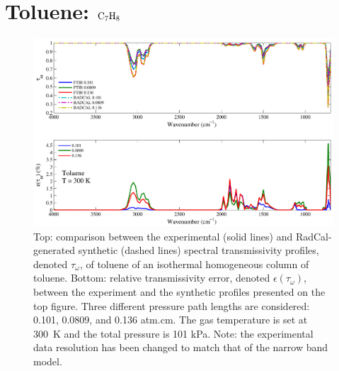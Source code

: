 \clearpage

\section{Toluene: $\rm C_7H_8$}

\begin{figure}[h]
\includegraphics[width=\textwidth]{../Verification/Results_Test2/Toluene_300.pdf}
\caption{Top: comparison between the experimental (solid lines) and RadCal-generated synthetic (dashed lines) spectral transmissivity profiles, denoted $\tau_{\omega}$, of toluene of an isothermal homogeneous column of toluene. Bottom: relative transmissivity error, denoted $\epsilon{(\tau_{\omega})}$, between the experiment and the synthetic profiles presented on the top figure. Three different pressure path lengths are considered: 0.101, 0.0809, and 0.136 atm.cm. The gas temperature is set at 300~K and the total pressure is 101 kPa. Note: the experimental data resolution has been changed to match that of the narrow band model. \label{fig:toluene_Verify_300K}}
\end{figure}

\newpage

